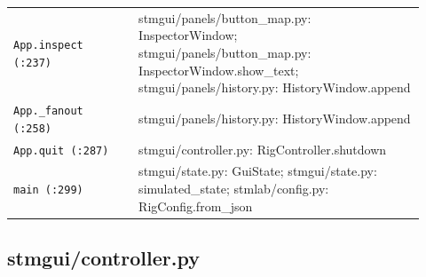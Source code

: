 \begin{longtable}{@{}>{\raggedright\arraybackslash}p{0.280\linewidth}>{\raggedright\arraybackslash}p{0.640\linewidth}@{}}
\texttt{App.\discretionary{}{}{}inspect (:237)} & stmgui/panels/button\_map.py: InspectorWindow; stmgui/panels/button\_map.py: InspectorWindow.show\_text; stmgui/panels/history.py: HistoryWindow.append \\
\texttt{App.\discretionary{}{}{}\_\discretionary{}{}{}fanout (:258)} & stmgui/panels/history.py: HistoryWindow.append \\
\texttt{App.\discretionary{}{}{}quit (:287)} & stmgui/controller.py: RigController.shutdown \\
\texttt{main (:299)} & stmgui/state.py: GuiState; stmgui/state.py: simulated\_state; stmlab/config.py: RigConfig.from\_json \\
\bottomrule
\end{longtable}
\normalsize

\subsection{stmgui/controller.py}

